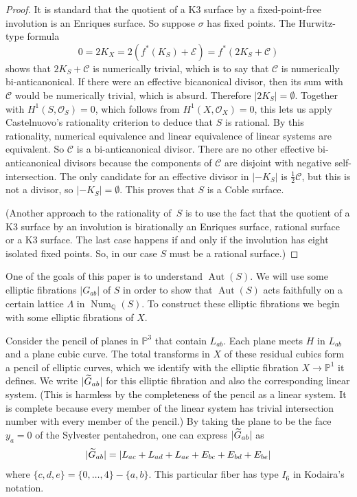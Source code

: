 \documentclass[11pt]{article}
\theoremstyle{definition}
\numberwithin{equation}{section}
\numberwithin{figure}{section}
\numberwithin{table}{section}
\let\oldtilde\tilde
\renewcommand*\tilde[1]{\mathchoice{\widetilde{#1}}{\widetilde{#1}}{\oldtilde{#1}}{\oldtilde{#1}}}
\newcommand*\Gtilde{\tilde G}
\newcommand*\Q{\mathbb{Q}}
\newcommand{\bbP}{{\mathbb{P}}}
\DeclareMathOperator{\Aut}{Aut}
\DeclareMathOperator{\Num}{Num}
\newcommand{\calC}{\mathcal{C}}
\newcommand{\calE}{\mathcal{E}}
\newcommand{\calO}{\mathcal{O}}
\begin{document}
\begin{proof}
It is standard that the quotient of a K3 surface by a fixed-point-free involution is an Enriques surface. So suppose $\sigma$ has fixed points. The Hurwitz-type formula
\begin{equation*}
\textstyle 0=2K_X=2(f^*(K_S)+\calE)=f^*(2K_S+\calC)
\end{equation*}
shows that $2K_S+\calC$ is numerically trivial, which is to say that $\calC$ is numerically bi-anticanonical. If there were an effective bicanonical divisor, then its sum with $\calC$ would be numerically trivial, which is absurd. Therefore $|2K_S|=\emptyset$. Together with $H^1(S,\calO_S) = 0$, which follows from $H^1(X,\calO_X) = 0$, this lets us apply Castelnuovo's rationality criterion to deduce that $S$ is rational. By this rationality, numerical equivalence and linear equivalence of linear systems are equivalent. So $\calC$ is a bi-anticanonical divisor. There are no other effective bi-anticanonical divisors because the components of $\calC$ are disjoint with negative self-intersection. The only candidate for an effective divisor in $\mathopen|-K_S|$ is $\frac12\calC$, but this is not a divisor, so $\mathopen|-K_S|=\emptyset$. This proves that $S$ is a Coble surface.

(Another approach to the rationality of~$S$ is to use the fact that the quotient of a K3 surface by an involution is birationally an Enriques surface, rational surface or a K3 surface. The last case happens if and only if the involution has eight isolated fixed points. So, in our case $S$ must be a rational surface.)
\end{proof}

One of the goals of this paper is to understand $\Aut(S)$. We will use some elliptic fibrations $|G_{ab}|$ of $S$ in order to show that $\Aut(S)$ acts faithfully on a certain lattice $\Lambda$ in $\Num_\Q(S)$. To construct these elliptic fibrations we begin with some elliptic fibrations of $X$.

Consider the pencil of planes in $\bbP^3$ that contain $L_{ab}$. Each plane meets $H$ in $L_{ab}$ and a plane cubic curve. The total transforms in $X$ of these residual cubics form a pencil of elliptic curves, which we identify with the elliptic fibration $X\to \bbP^1$ it defines. We write $|\Gtilde_{ab}|$ for this elliptic fibration and also the corresponding linear system. (This is harmless by the completeness of the pencil as a linear system. It is complete because every member of the linear system has trivial intersection number with every member of the pencil.) By taking the plane to be the face $y_a=0$ of the Sylvester pentahedron, one can express $|\Gtilde_{ab}|$ as
\begin{equation}\label{EqLinearSystem}
|\Gtilde_{ab}|=|L_{ac}+L_{ad}+L_{ae}+E_{bc}+E_{bd}+E_{be}|
\end{equation}
where $\{c,d,e\}=\{0,\dots,4\}-\{a,b\}$. This particular fiber has type $I_6$ in Kodaira's notation.
\end{document}
